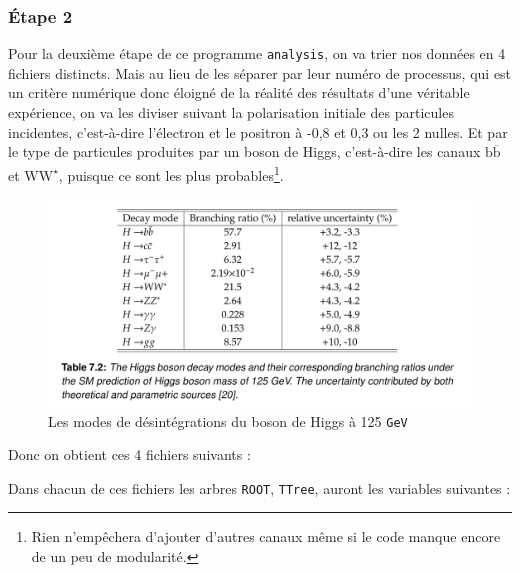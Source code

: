 \documentclass[10pt,a4paper]{report}
\newcommand{\cad}{c'est-à-dire\xspace}
\newcommand{\ROOT}{\texttt{ROOT}\xspace}
\newcommand{\analysis}{\texttt{analysis}\xspace}
\newcommand{\bbar}{\overline{b}}
\newcommand{\Wstar}{W^{\star}}
\newcommand{\bb}{$\mathrm{b\bbar}$\xspace}
\newcommand{\WW}{$\mathrm{W\Wstar}$\xspace}
\newcommand{\GeV}{\texttt{GeV}}
\begin{document}
\subsubsection{Étape 2}

Pour la deuxième étape de ce programme \analysis, on va trier nos données en 4 fichiers distincts. 
Mais au lieu de les séparer par leur numéro de processus, qui est un critère numérique donc éloigné de la réalité des résultats d'une véritable expérience, on va les diviser suivant la polarisation initiale des particules incidentes, \cad l'électron et le positron à -0,8 et 0,3 ou les 2 nulles. 
Et par le type de particules produites par un boson de Higgs, \cad les canaux \bb et \WW, puisque ce sont les plus probables\footnote{Rien n'empêchera d'ajouter d'autres canaux même si le code manque encore de un peu de modularité.}.

\begin{figure}[h!]
	\centering
	\includegraphics[width=\textwidth]{../img/Higgs_decay_125GeV.png} 
	\caption{
		Les modes de désintégrations du boson de Higgs à 125 \GeV 
		\cite{liu:tel-03405418}
	}
\end{figure}

Donc on obtient ces 4 fichiers suivants :



Dans chacun de ces fichiers les arbres \ROOT, \texttt{TTree}, auront les variables suivantes :
\end{document}
